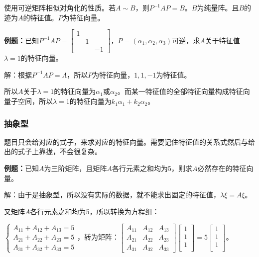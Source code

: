 使用可逆矩阵相似对角化的性质。若$A\sim B$，则$P^{-1}AP=B$。$B$为纯量阵。且$B$的迹为$A$的特征值。$P$为特征向量。\medskip

\textbf{例题：}已知$P^{-1}AP=\left[\begin{array}{ccc}
    1 \\
     & 1 \\
     & & -1
\end{array}\right]$，$P=(\alpha_1,\alpha_2,\alpha_3)$可逆，求$A$关于特征值$\lambda=1$的特征向量。

解：根据$P^{-1}AP=\Lambda$，所以$P$为特征向量，$1,1,-1$为特征值。

所以$A$关于$\lambda=1$的特征向量为$\alpha_1$或$\alpha_2$。而某一特征值的全部特征向量构成特征向量子空间，所以$\lambda=1$的特征向量为$k_1\alpha_1+k_2\alpha_2$。

\subsubsection{抽象型}

题目只会给对应的式子，来求对应的特征向量。需要记住特征值的关系式然后与给出的式子上靠拢，不会很复杂。

\textbf{例题：}已知$A$为三阶矩阵，且矩阵$A$各行元素之和均为5，则求$A$必然存在的特征向量。

解：由于是抽象型，所以没有实际的数据，就不能求出固定的特征值，$\lambda\xi=A\xi$。

又矩阵$A$各行元素之和均为5，所以转换为方程组：\medskip

$\left\{\begin{array}{l}
    A_{11}+A_{12}+A_{13}=5 \\
    A_{21}+A_{22}+A_{23}=5 \\
    A_{31}+A_{32}+A_{33}=5
\end{array}\right.$，转为矩阵：$\left[\begin{array}{ccc}
    A_{11} & A_{12} & A_{13} \\
    A_{21} & A_{22} & A_{23} \\
    A_{31} & A_{32} & A_{33}
\end{array}\right]\left[\begin{array}{c}
    1 \\
    1 \\
    1 \\
\end{array}\right]=5\left[\begin{array}{c}
    1 \\
    1 \\
    1 \\
\end{array}\right]$。\medskip

